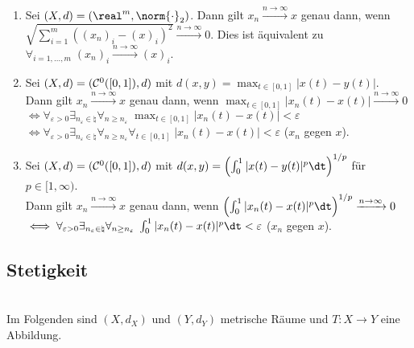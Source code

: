 \begin{Bsp}
    \begin{enumerate}[label=\emph{(\alph*)}]
        \item
        Sei $(X, d) = (\real^m, \norm{\cdot}_2)$.
        Dann gilt $x_n \xrightarrow{n \to \infty} x$ genau dann, wenn\\
        $\sqrt{\sum_{i=1}^m ((x_n)_i - (x)_i)^2} \xrightarrow{n \to \infty} 0$.
        Dies ist äquivalent zu $\forall_{i=1,\dotsc,m}\; (x_n)_i \xrightarrow{n \to \infty} (x)_i$.
        
        \item
        Sei $(X, d) = (\mathcal{C}^0([0, 1]), d)$ mit $d(x, y) = \max_{t \in [0, 1]} |x(t) - y(t)|$.\\
        Dann gilt $x_n \xrightarrow{n \to \infty} x$ genau dann, wenn
        $\max_{t \in [0, 1]} |x_n(t) - x(t)| \xrightarrow{n \to \infty} 0$\\
        $\iff \forall_{\varepsilon > 0} \exists_{n_\varepsilon \in \natural}
        \forall_{n \ge n_\varepsilon}\; \max_{t \in [0, 1]} |x_n(t) - x(t)| < \varepsilon$\\
        $\iff \forall_{\varepsilon > 0} \exists_{n_\varepsilon \in \natural}
        \forall_{n \ge n_\varepsilon} \forall_{t \in [0, 1]}\; |x_n(t) - x(t)| < \varepsilon$
        ($x_n$  gegen $x$).
        
        \item 
        Sei $(X, d) = (\mathcal{C}^0([0, 1]), d)$ mit
        $d(x, y) = \left(\int_0^1 |x(t) - y(t)|^p \dt\right)^{1/p}$ für $p \in [1, \infty)$.\\
        Dann gilt $x_n \xrightarrow{n \to \infty} x$ genau dann, wenn
        $\left(\int_0^1 |x_n(t) - x(t)|^p \dt\right)^{1/p} \xrightarrow{n \to \infty} 0$\\
        $\iff \forall_{\varepsilon > 0} \exists_{n_\varepsilon \in \natural}
        \forall_{n \ge n_\varepsilon}\; \int_0^1 |x_n(t) - x(t)|^p\dt < \varepsilon$
        ($x_n$  gegen $x$).
    \end{enumerate}
\end{Bsp}

\subsection{%
    Stetigkeit%
}

\begin{Bem}\\
    Im Folgenden sind $(X, d_X)$ und $(Y, d_Y)$ metrische Räume und
    $T\colon X \rightarrow Y$ eine Abbildung.
\end{Bem}

